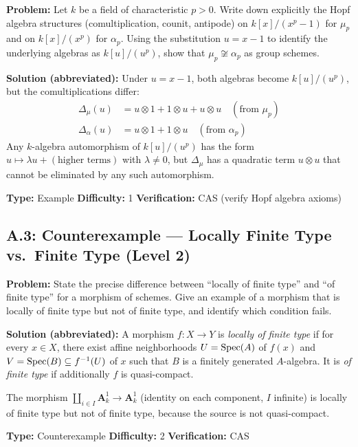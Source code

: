 \begin{problembox}[title={\ecagid{0003} --- Basic Concepts}]
\textbf{Problem:} Let $k$ be a field of characteristic $p > 0$. Write down explicitly the Hopf algebra structures (comultiplication, counit, antipode) on $k[x]/(x^p - 1)$ for $\mu_p$ and on $k[x]/(x^p)$ for $\alpha_p$. Using the substitution $u = x - 1$ to identify the underlying algebras as $k[u]/(u^p)$, show that $\mu_p \not\cong \alpha_p$ as group schemes.

\medskip
\textbf{Solution (abbreviated):}
Under $u = x-1$, both algebras become $k[u]/(u^p)$, but the comultiplications differ:
\begin{align*}
\Delta_\mu(u) &= u \otimes 1 + 1 \otimes u + u \otimes u \quad (\text{from } \mu_p) \\
\Delta_\alpha(u) &= u \otimes 1 + 1 \otimes u \quad (\text{from } \alpha_p)
\end{align*}
Any $k$-algebra automorphism of $k[u]/(u^p)$ has the form $u \mapsto \lambda u + (\text{higher terms})$ with $\lambda \neq 0$, but $\Delta_\mu$ has a quadratic term $u \otimes u$ that cannot be eliminated by any such automorphism.

\medskip
\textbf{Type:} Example \quad \textbf{Difficulty:} 1 \quad \textbf{Verification:} CAS (verify Hopf algebra axioms)
\end{problembox}

\subsection*{A.3: Counterexample --- Locally Finite Type vs.\ Finite Type (Level 2)}

\begin{problembox}[title={\ecagid{0043} --- Basic Concepts}]
\textbf{Problem:} State the precise difference between ``locally of finite type'' and ``of finite type'' for a morphism of schemes. Give an example of a morphism that is locally of finite type but not of finite type, and identify which condition fails.

\medskip
\textbf{Solution (abbreviated):}
A morphism $f: X \to Y$ is \emph{locally of finite type} if for every $x \in X$, there exist affine neighborhoods $U = \operatorname{Spec}(A)$ of $f(x)$ and $V = \operatorname{Spec}(B) \subseteq f^{-1}(U)$ of $x$ such that $B$ is a finitely generated $A$-algebra. It is \emph{of finite type} if additionally $f$ is quasi-compact.

The morphism $\coprod_{i \in I} \mathbf{A}^1_k \to \mathbf{A}^1_k$ (identity on each component, $I$ infinite) is locally of finite type but not of finite type, because the source is not quasi-compact.

\medskip
\textbf{Type:} Counterexample \quad \textbf{Difficulty:} 2 \quad \textbf{Verification:} CAS
\end{problembox}

